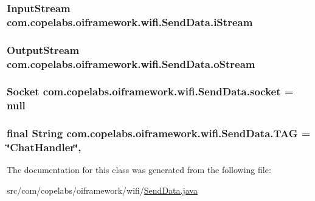 \subsubsection[{i\+Stream}]{\setlength{\rightskip}{0pt plus 5cm}Input\+Stream com.\+copelabs.\+oiframework.\+wifi.\+Send\+Data.\+i\+Stream\hspace{0.3cm}{\ttfamily [private]}}\label{classcom_1_1copelabs_1_1oiframework_1_1wifi_1_1_send_data_aeb2f33e45f684cac0cde3495ddac0a15}
\hypertarget{classcom_1_1copelabs_1_1oiframework_1_1wifi_1_1_send_data_aa2e24df043ee09164380f1dc9fc20812}{}
\subsubsection[{o\+Stream}]{\setlength{\rightskip}{0pt plus 5cm}Output\+Stream com.\+copelabs.\+oiframework.\+wifi.\+Send\+Data.\+o\+Stream\hspace{0.3cm}{\ttfamily [private]}}\label{classcom_1_1copelabs_1_1oiframework_1_1wifi_1_1_send_data_aa2e24df043ee09164380f1dc9fc20812}
\hypertarget{classcom_1_1copelabs_1_1oiframework_1_1wifi_1_1_send_data_aa68cb225ef22bd5e5b057320c8a28c0e}{}
\subsubsection[{socket}]{\setlength{\rightskip}{0pt plus 5cm}Socket com.\+copelabs.\+oiframework.\+wifi.\+Send\+Data.\+socket = null\hspace{0.3cm}{\ttfamily [private]}}\label{classcom_1_1copelabs_1_1oiframework_1_1wifi_1_1_send_data_aa68cb225ef22bd5e5b057320c8a28c0e}
\hypertarget{classcom_1_1copelabs_1_1oiframework_1_1wifi_1_1_send_data_a07d7509ad0cd62acbc46c1e85602ac1e}{}
\subsubsection[{T\+A\+G}]{\setlength{\rightskip}{0pt plus 5cm}final String com.\+copelabs.\+oiframework.\+wifi.\+Send\+Data.\+T\+A\+G = \char`\"{}Chat\+Handler\char`\"{}\hspace{0.3cm}{\ttfamily [static]}, {\ttfamily [private]}}\label{classcom_1_1copelabs_1_1oiframework_1_1wifi_1_1_send_data_a07d7509ad0cd62acbc46c1e85602ac1e}


The documentation for this class was generated from the following file\+:\begin{DoxyCompactItemize}
\item 
src/com/copelabs/oiframework/wifi/\hyperlink{_send_data_8java}{Send\+Data.\+java}\end{DoxyCompactItemize}
